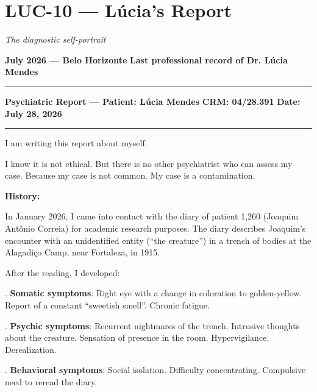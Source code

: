 \section*{\textbf{LUC-10} --- Lúcia's Report}

\noindent \textit{The diagnostic self-portrait}

\noindent \textbf{July 2026 --- Belo Horizonte}
\textbf{Last professional record of Dr. Lúcia Mendes}

\vspace{0.5em}\noindent\rule{\textwidth}{0.5pt}\vspace{0.5em}

\noindent \textbf{Psychiatric Report --- Patient: Lúcia Mendes}
\textbf{CRM: 04/28.391}
\textbf{Date: July 28, 2026}

\vspace{0.5em}\noindent\rule{\textwidth}{0.5pt}\vspace{0.5em}

\noindent I am writing this report about myself.

\noindent I know it is not ethical. But there is no other psychiatrist who can assess my case. Because my case is not common. My case is a contamination.

\noindent \textbf{History:}

\noindent In January 2026, I came into contact with the diary of patient 1,260 (Joaquim Antônio Correia) for academic research purposes. The diary describes Joaquim's encounter with an unidentified entity (\textquotedblleft{}the creature\textquotedblright{}) in a trench of bodies at the Alagadiço Camp, near Fortaleza, in 1915.

\noindent After the reading, I developed:

. \textbf{Somatic symptoms}: Right eye with a change in coloration to golden-yellow. Report of a constant \textquotedblleft{}sweetish smell\textquotedblright{}. Chronic fatigue.

. \textbf{Psychic symptoms}: Recurrent nightmares of the trench. Intrusive thoughts about the creature. Sensation of presence in the room. Hypervigilance. Derealization.

. \textbf{Behavioral symptoms}: Social isolation. Difficulty concentrating. Compulsive need to reread the diary.


